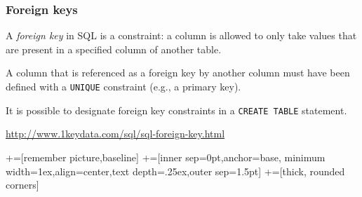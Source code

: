 \documentclass[english,serif,mathserif]{beamer}
\begin{document}
\begin{frame}
  \frametitle{Foreign keys}

  A \emph{foreign key} in SQL is a constraint: a column is allowed to only take
  values that are present in a specified column of another table.

  \+ A column that is referenced as a foreign key by another column must have
  been defined with a \texttt{UNIQUE} constraint (e.g., a primary key).

  \+
  It is possible to designate foreign key constraints
  in a \texttt{CREATE TABLE} statement.

  \+
  \begin{seealso}
    \url{http://www.1keydata.com/sql/sql-foreign-key.html}
  \end{seealso}
\end{frame}

%
\newcommand\tabnode[1]{\addtocounter{nodecount}{1} \tikz \node (\arabic{nodecount}) {#1};}
+=[remember picture,baseline]
+=[inner sep=0pt,anchor=base, minimum width=1ex,align=center,text depth=.25ex,outer sep=1.5pt]
+=[thick, rounded corners]
\end{document}
